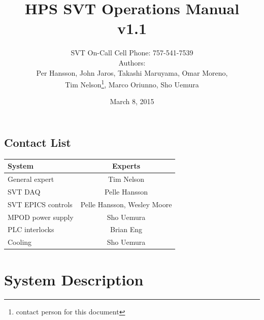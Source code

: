 \documentclass[12pt]{report}
\title{HPS SVT Operations Manual \\ v1.1}
\author{SVT On-Call Cell Phone: 757-541-7539 \\ 
Authors: \\
Per Hansson, John Jaros, Takashi Maruyama, Omar Moreno,\\ Tim Nelson\footnote{contact person for this document}, Marco Oriunno, Sho Uemura}
\date{March 8, 2015} %
\begin{document}
\maketitle

\tableofcontents

\newpage

\section{Contact List}

\begin{center}
\begin{tabular}{lc}
\hline \hline 
System & Experts \\
\hline
General expert & Tim Nelson \\
SVT DAQ & Pelle Hansson \\
SVT EPICS controls & Pelle Hansson, Wesley Moore \\
MPOD power supply & Sho Uemura \\
PLC interlocks & Brian Eng \\
Cooling & Sho Uemura \\
 \hline \hline
\end{tabular}
\end{center}

\chapter{System Description}
\end{document}
